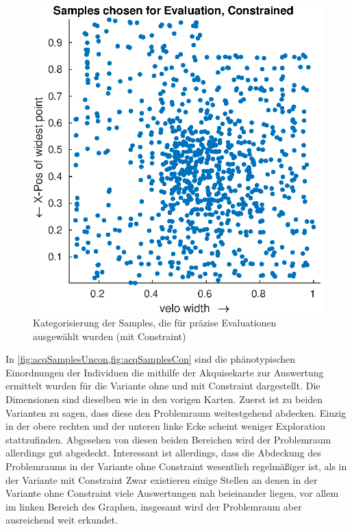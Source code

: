 \begin{figure}[h]
\begin{minipage}{0.45\textwidth}
		\includegraphics[width=1\linewidth]{bilder/6pt1000Samples/acqSamplesCon}
		\caption{Kategorisierung der Samples, die für präzise Evaluationen ausgewählt wurden (mit Constraint)}
		\label{fig:acqSamplesCon}
	\end{minipage}
\end{figure}

In \cref{fig:acqSamplesUncon,fig:acqSamplesCon} sind die phänotypischen Einordnungen der Individuen die mithilfe der Akquisekarte zur Auswertung ermittelt wurden für die Variante ohne und mit Constraint dargestellt.
Die Dimensionen sind dieselben wie in den vorigen Karten.
Zuerst ist zu beiden Varianten zu sagen, dass diese den Problemraum weitestgehend abdecken.
Einzig in der obere rechten und der unteren linke Ecke scheint weniger Exploration stattzufinden.
Abgesehen von diesen beiden Bereichen wird der Problemraum allerdings gut abgedeckt.
Interessant ist allerdings, dass die Abdeckung des Problemraums in der Variante ohne Constraint wesentlich regelmäßiger ist, als in der Variante mit Constraint
Zwar existieren einige Stellen an denen in der Variante ohne Constraint viele Auswertungen nah beieinander liegen, vor allem im linken Bereich des Graphen, insgesamt wird der Problemraum aber ausreichend weit erkundet.

